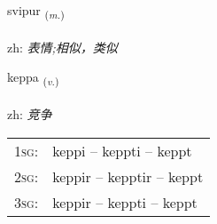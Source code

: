 \documentclass[frontgrid, backgrid]{flacards}\usepackage[]{graphicx}\usepackage[]{color}
\begin{document}
\renewcommand{\flhead}{\vskip5pt \fboxsep=0pt {\small\bfseries\footnotesize Nafnorð | 名词}}
\renewcommand{\fcfoot}{\vskip5pt \fboxsep=0pt \hspace{2pt}{\small\bfseries\footnotesize 2K}}

\renewcommand{\blhead}{\vskip5pt {\small\bfseries\footnotesize Nafnorð | 名词 }}
\renewcommand{\bcfoot}{\vskip5pt \hspace{2pt}{\small\bfseries\footnotesize 2K}}


{svipur \small{\textsubscript{(\textit{m.})}} \\[1ex] %
\textphonetic{[svɪːpʏr]} \\
zh: \emph{表情;相似，类似} \\  [2ex]
\renewcommand*{\arraystretch}{0.8}
}

\renewcommand{\flhead}{\vskip5pt \fboxsep=0pt {\small\bfseries\footnotesize Sagnorð | 动词}}
\renewcommand{\fcfoot}{\vskip5pt \fboxsep=0pt \hspace{2pt}{\small\bfseries\footnotesize 2K}}

\renewcommand{\blhead}{\vskip5pt {\small\bfseries\footnotesize Sagnorð | 动词 }}
\renewcommand{\bcfoot}{\vskip5pt \hspace{2pt}{\small\bfseries\footnotesize 2K}}


{keppa \small{\textsubscript{(\textit{v.})}} \\[1ex] %
\textphonetic{[cʰɛhpa]} \\
zh: \emph{竞争} \\  [2ex]
\renewcommand*{\arraystretch}{0.8}
\begin{tabular}{p{1cm}l}
\textsc{1sg}: & keppi -- keppti -- keppt \\ 
\textsc{2sg}: & keppir -- kepptir -- keppt \\ 
\textsc{3sg}: & keppir -- keppti -- keppt \\ 
\end{tabular}
}
\end{document}
